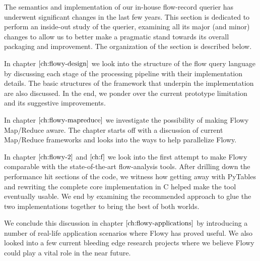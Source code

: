 The semantics and implementation of our in-house flow-record querier has
underwent significant changes in the last few years. This section is dedicated
to perform an inside-out study of the querier, examining all its major (and
minor) changes to allow us to better make a pragmatic stand towards its
overall packaging and improvement. The organization of the section is
described below.

\vspace{50pt}

In chapter $\ref{ch:flowy-design}$ we look into the structure of the flow
query language by discussing each stage of the processing pipeline with their
implementation details. The basic structures of the framework that underpin
the implementation are also discussed. In the end, we ponder over the current
prototype limitation and its suggestive improvements.

In chapter $\ref{ch:flowy-mapreduce}$ we investigate the possibility of making
Flowy Map/Reduce aware. The chapter starts off with a discussion of current
Map/Reduce frameworks and looks into the ways to help parallelize Flowy.

In chapter $\ref{ch:flowy-2}$ and $\ref{ch:f}$ we look into the first attempt
to make Flowy comparable with the state-of-the-art flow-analysis tools. After
drilling down the performance hit sections of the code, we witness how getting
away with PyTables and rewriting the complete core implementation in C helped
make the tool eventually usable. We end by examining the recommended approach
to glue the two implementations together to bring the best of both worlds.

We conclude this discussion in chapter $\ref{ch:flowy-applications}$ by
introducing a number of real-life application scenarios where Flowy has proved
useful. We also looked into a few current bleeding edge research projects
where we believe Flowy could play a vital role in the near future.
